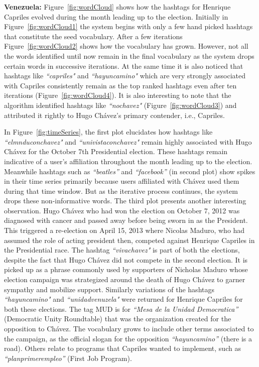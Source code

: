 \noindent
{\bf Venezuela:} 
Figure~\ref{fig:wordCloud} shows how the hashtags for Henrique Capriles evolved during the month leading up to the election.
Initially in Figure~\ref{fig:wordCloud1} the system begins with only a few hand picked hashtags that constitute the seed vocabulary. 
After a few iterations Figure~\ref{fig:wordCloud2} shows how the vocabulary has grown.
However, not all the words identified until now remain in the final vocabulary as the system drops certain words in successive iterations.
At the same time it is also noticed that hashtags like \emph{``capriles"} and \emph{``hayuncamino"} which are very strongly associated with Capriles consistently remain as the top ranked hashtags even after ten iterations (Figure~\ref{fig:wordCloud4}). 
It is also interesting to note that the algorithm identified hashtags like \emph{``nochavez"} (Figure~\ref{fig:wordCloud3}) and attributed it rightly to Hugo Ch\'{a}vez's primary contender, i.e., Capriles. 

In Figure~\ref{fig:timeSeries}, the first plot elucidates how hashtags like \emph{``elmnduconchavez"} and 
\emph{``univistaconchavez"} remain highly associated with Hugo Ch\'{a}vez for the October 7th Presidential election. 
These hashtags remain indicative of a user's affiliation throughout the month leading up to the election.
Meanwhile hashtags such as \emph{``beatles''} and \emph{``facebook''} (in second plot) show spikes in their time series primarily because users affiliated with Ch\'{a}vez used them during that time window. 
But as the iterative process continues, the system drops these non-informative words.
The third plot presents another interesting observation.
Hugo Ch\'{a}vez who had won the election on October 7, 2012 was diagnosed with cancer and passed away
before being sworn in as the President.
This triggered a re-election on April 15, 2013 where Nicolas Maduro, who had assumed the role of acting president then, competed 
against Henrique Capriles in the Presidential race.
The hashtag \emph{``vivachavez"} is part of both the elections, despite the 
fact that Hugo Ch\'{a}vez did not compete in the second election.
It is picked up as a phrase commonly used by supporters of Nicholas Maduro whose election campaign was strategized around the death of Hugo Ch\'{a}vez to garner sympathy and mobilize support.
Similarly variations of the hashtags \emph{``hayuncamino"} and \emph{``unidadvenuzela"} were returned 
for Henrique Capriles for both these elections.
The tag MUD is for \emph{``Mesa de la Unidad Democratica”} (Democratic Unity Roundtable) that was the organization created for the opposition to Ch\'{a}vez. 
The vocabulary grows to include other terms associated to the campaign, as the official slogan for the opposition \emph{``hayuncamino”} (there is a road). 
Others relate to programs that Capriles wanted to implement, such as \emph{``planprimerempleo”} (First Job Program). 


